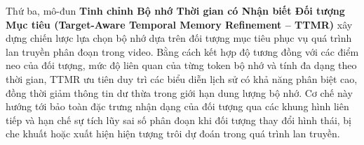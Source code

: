 Thứ ba, mô-đun \textbf{Tinh chỉnh Bộ nhớ Thời gian có Nhận biết Đối
tượng Mục tiêu (Target-Aware Temporal Memory Refinement -- TTMR)}
xây dựng chiến lược lựa chọn bộ nhớ dựa trên đối tượng mục
tiêu phục vụ quá trình lan truyền phân đoạn trong video. Bằng
cách kết hợp độ tương đồng với các điểm neo của đối tượng,
mức độ liên quan của từng token bộ nhớ và tính đa dạng theo
thời gian, TTMR ưu tiên duy trì các biểu diễn lịch sử có khả
năng phân biệt cao, đồng thời giảm thông tin dư thừa trong
giới hạn dung lượng bộ nhớ. Cơ chế này hướng tới bảo toàn
đặc trưng nhận dạng của đối tượng qua các khung hình liên
tiếp và hạn chế sự tích lũy sai số phân đoạn khi đối tượng
thay đổi hình thái, bị che khuất hoặc xuất hiện hiện tượng
trôi dự đoán trong quá trình lan truyền.
